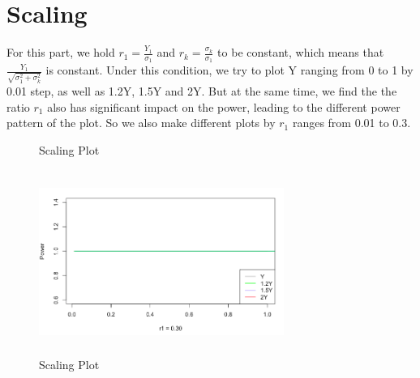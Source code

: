 \documentclass[10pt,english]{article}\usepackage{graphicx, color}
\numberwithin{equation}{section}
\numberwithin{figure}{section}
\begin{document}
\section{Scaling}
For this part, we hold $r_1=\frac{Y_1}{\sigma_1}$ and $r_k=\frac{\sigma_k}{\sigma_1}$ to be constant, which means that $\frac{Y_1}{\sqrt{\sigma_1^2+\sigma_k^2}}$ is constant. Under this condition, we try to plot Y ranging from 0 to 1 by 0.01 step, as well as 1.2Y, 1.5Y and 2Y. But at the same time, we find the the ratio $r_1$ also has significant impact on the power, leading to the different power pattern of the plot. So we also make different plots by $r_1$ ranges from 0.01 to 0.3.\\
\begin{figure}[htbp]
\centering{}
\caption{Scaling Plot}
\end{figure}
\begin{figure}[htbp]
\centering\includegraphics[width=8cm, height=6cm]{sca3}
\caption{\label{1}Scaling Plot}
\end{figure}
\end{document}
